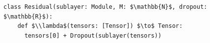 \documentclass[border=10pt]{standalone}
\begin{document}
\begin{lstlisting}
class Residual(sublayer: Module, M: $\mathbb{N}$, dropout: $\mathbb{R}$):
    def $\\lambda$(tensors: [Tensor]) $\to$ Tensor:
      tensors[0] + Dropout(sublayer(tensors))
\end{lstlisting}
\end{document}
